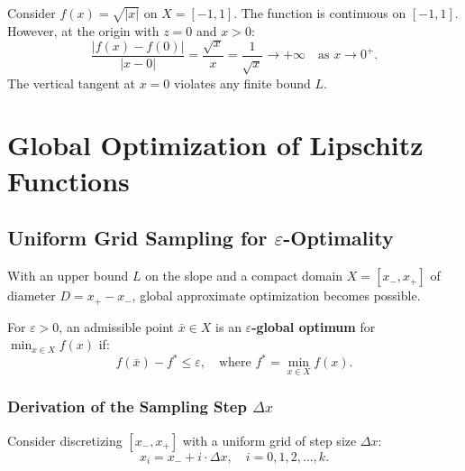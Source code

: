 \begin{example}
Consider $f(x) = \sqrt{|x|}$ on $X = [-1, 1]$. The function is continuous on $[-1, 1]$. However, at the origin with $z = 0$ and $x > 0$:
\begin{equation}
    \frac{|f(x) - f(0)|}{|x - 0|} = \frac{\sqrt{x}}{x} = \frac{1}{\sqrt{x}} \to +\infty \quad \text{as } x \to 0^+.
\end{equation}
The vertical tangent at $x = 0$ violates any finite bound $L$.
\end{example}

\FloatBarrier
\section{Global Optimization of Lipschitz Functions}
\label{sec:univariate-global-lipschitz-opt-en}

\subsection{Uniform Grid Sampling for $\varepsilon$-Optimality}
With an upper bound $L$ on the slope and a compact domain $X = [x_-, x_+]$ of diameter $D = x_+ - x_-$, global approximate optimization becomes possible.

\begin{definition}
For $\varepsilon > 0$, an admissible point $\bar{x} \in X$ is an \textbf{$\varepsilon$-global optimum} for $\min_{x \in X} f(x)$ if:
\begin{equation}
    f(\bar{x}) - f^* \le \varepsilon, \quad \text{where } f^* = \min_{x \in X} f(x).
\end{equation}
\end{definition}

\subsubsection{Derivation of the Sampling Step $\Delta x$}
Consider discretizing $[x_-, x_+]$ with a uniform grid of step size $\Delta x$:
\begin{equation}
    x_i = x_- + i \cdot \Delta x, \quad i = 0, 1, 2, \dots, k.
\end{equation}

